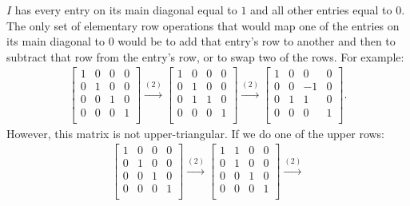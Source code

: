 \documentclass[12pt]{article}
\begin{document}
\begin{enumerate}
    $I$ has every entry on its main diagonal equal to $1$ and all
    other entries equal to $0$. The only set of elementary row
    operations that would map one of the entries on its main
    diagonal to $0$ would be to add that entry's row to another
    and then to subtract that row from the entry's row, or to
    swap two of the rows. For example:
    \begin{align*}
      \begin{bmatrix}
        1 & 0 & 0 & 0\\
        0 & 1 & 0 & 0\\
        0 & 0 & 1 & 0\\
        0 & 0 & 0 & 1\\
      \end{bmatrix}
      \xrightarrow{(2)}
      \begin{bmatrix}
        1 & 0 & 0 & 0\\
        0 & 1 & 0 & 0\\
        0 & 1 & 1 & 0\\
        0 & 0 & 0 & 1\\
      \end{bmatrix}
      \xrightarrow{(2)}
      \begin{bmatrix}
        1 & 0 & 0  & 0\\
        0 & 0 & -1 & 0\\
        0 & 1 & 1  & 0\\
        0 & 0 & 0  & 1\\
      \end{bmatrix}.
    \end{align*}
    However, this matrix is not upper-triangular. If we do one of
    the upper rows:
    \begin{align*}
      \begin{bmatrix}
        1 & 0 & 0 & 0\\
        0 & 1 & 0 & 0\\
        0 & 0 & 1 & 0\\
        0 & 0 & 0 & 1\\
      \end{bmatrix}
      \xrightarrow{(2)}
      \begin{bmatrix}
        1 & 1 & 0 & 0\\
        0 & 1 & 0 & 0\\
        0 & 0 & 1 & 0\\
        0 & 0 & 0 & 1\\
      \end{bmatrix}
      \xrightarrow{(2)}

\end{align*}
\end{enumerate}
\end{document}

